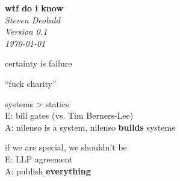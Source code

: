 \documentclass{article}
\begin{document}
\begin{titlepage}
   \begin{center}
     \Huge\textbf{wtf do i know}\\
     \vspace{5cm}
     \large\textit{Steven Deobald}\\
     \large\textit{Version 0.1}\\
     \large\textit\today\\
   \end{center}
\end{titlepage}

\begin{center}
  \Huge{certainty is failure}
\end{center}

\pagebreak

\begin{center}
  \Huge{``fuck charity''}
\end{center}

\pagebreak

\begin{center}
  \Huge{systems \hspace{1em}\textgreater\hspace{1em} statics}\\
  \vspace{3cm}
  \Huge{E: bill gates (vs. Tim Berners-Lee)}\\
  \Huge{A: nilenso is a system, nilenso \textbf{builds} systems}
\end{center}

\pagebreak

\begin{center}
  \Huge{if we are special, we shouldn't be}\\
  \vspace{3cm}
  \Huge{E: LLP agreement}\\
  \Huge{A: publish \textbf{everything}}
\end{center}
\end{document}
